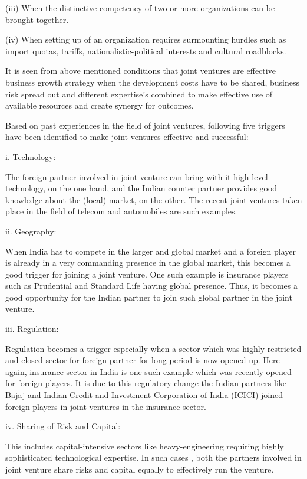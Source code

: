 \documentclass{article}
\begin{document}
(iii) When the distinctive competency of two or more organizations can be brought together.

(iv) When setting up of an organization requires surmounting hurdles such as import quotas, tariffs, nationalistic-political 
interests and cultural roadblocks.

It is seen from above mentioned conditions that joint ventures are effective business growth strategy when the development costs 
have to be shared, business risk spread out and different expertise’s combined to make effective use of available resources and 
create synergy for outcomes.

Based on past experiences in the field of joint ventures, following five triggers have been identified to make joint ventures 
effective and successful:

i. Technology:

The foreign partner involved in joint venture can bring with it high-level technology, on the one hand, and the Indian counter
 partner provides good knowledge about the (local) market, on the other. The recent joint ventures taken place in the field of 
 telecom and automobiles are such examples.

ii. Geography:

When India has to compete in the larger and global market and a foreign player is already in a very commanding presence in the
 global market, this becomes a good trigger for joining a joint venture. One such example is insurance players such as Prudential
  and Standard Life having global presence. Thus, it becomes a good opportunity for the Indian partner to join such global partner
   in the joint venture.

iii. Regulation:

Regulation becomes a trigger especially when a sector which was highly restricted and closed sector for foreign partner for long
period is now opened up. Here again, insurance sector in India is one such example which was recently opened for foreign players.
It is due to this regulatory change the Indian partners like Bajaj and Indian Credit and Investment Corporation of India (ICICI)
joined foreign players in joint ventures in the insurance sector.

iv. Sharing of Risk and Capital:

This includes capital-intensive sectors like heavy-engineering requiring highly sophisticated technological expertise. In such cases
, both the partners involved in joint venture share risks and capital equally to effectively run the venture.
\end{document}
